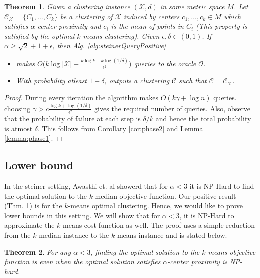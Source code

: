 \documentclass[11pt]{article}
\newtheorem{theorem}{Theorem}
\newcommand{\mc}{\mathcal}
\begin{document}
\begin{theorem}
\label{thm:steinerQueryPositive}
Given a clustering instance $(\mc X, d)$ in some metric space $M$. Let $\mc C_{\mc X} = \{C_1, \ldots, C_k\}$ be a clustering of $\mc X$ induced by centers $c_1, \ldots, c_k \in M$ which satisfies $\alpha$-center proximity and $c_i$ is the mean of points in $C_i$ (This property is satisfied by the optimal $k$-means clustering). Given $\epsilon, \delta \in (0, 1)$. If $\alpha \ge \sqrt{2}+1 + \epsilon$, then Alg. \ref{alg:steinerQueryPositive}
\begin{itemize}[nolistsep,noitemsep]
\item makes $O\big(k\log |\mc X| + \frac{k\log k + k\log (1/\delta)}{\epsilon^2}\big)$ queries to the oracle $\mc O$.
\item With probability atleast $1-\delta$, outputs a clustering $\mc C$ such that $\mc C = \mc C_{\mc X}$.
\end{itemize}
\end{theorem}

\begin{proof}
During every iteration the algorithm makes $O(k\gamma + \log n)$ queries. choosing $\gamma > c\frac{\log k + \log(1/\delta)}{\epsilon^2}$ gives the required number of queries. Also, observe that the probability of failure at each step is $\delta/k$ and hence the total probability is atmost $\delta$. This follows from Corollary \ref{cor:phase2} and Lemma \ref{lemma:phase1}.  
\end{proof}

\subsection{Lower bound}
In the steiner setting, Awasthi et. al \cite{awasthi2012center} showerd that for $\alpha < 3$ it is NP-Hard to find the optimal solution to the $k$-median objective function. Our positive result (Thm. \ref{thm:steinerQueryPositive}) is for the $k$-means optimal clustering. Hence, we would like to prove lower bounds in this setting. We will show that for $\alpha < 3$, it is NP-Hard to approximate the $k$-means cost function as well. The proof uses a simple reduction from the $k$-median instance to the $k$-means instance and is stated below.

\begin{theorem}
For any $\alpha < 3$, finding the optimal solution to the $k$-means objective function is even when the optimal solution satisfies $\alpha$-center proximity is NP-hard.
\end{theorem}
\end{document}
